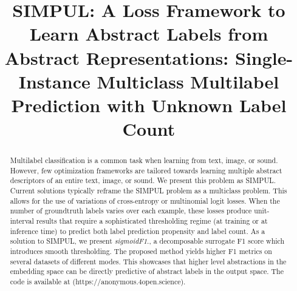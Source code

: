 \documentclass[sigconf,natbib,screen=true,review=true,anonymous]{acmart}
\begin{document}
\title{SIMPUL: A Loss Framework to Learn Abstract Labels from Abstract Representations: Single-Instance Multiclass Multilabel Prediction with Unknown Label Count}

\begin{abstract}
Multilabel classification is a common task when learning from text, image, or sound. However, few optimization frameworks are tailored towards learning multiple abstract descriptors of an entire text, image, or sound. We present this problem as SIMPUL. Current solutions typically reframe the SIMPUL problem as a multiclass problem. This allows for the use of variations of cross-entropy or multinomial logit losses. When the number of groundtruth labels varies over each example, these losses produce unit-interval results that require a sophisticated thresholding regime (at training or at inference time) to predict both label prediction propensity and label count. As a solution to SIMPUL, we present \emph{sigmoidF1}., a decomposable surrogate F1 score which introduces smooth thresholding. The proposed method yields higher F1 metrics on several datasets of different modes. This showcases that higher level abstractions in the embedding space can be directly predictive of abstract labels in the output space. The code is available at (https://anonymous.4open.science).
  
  
  
\end{abstract}



\maketitle

\acresetall
\end{document}
